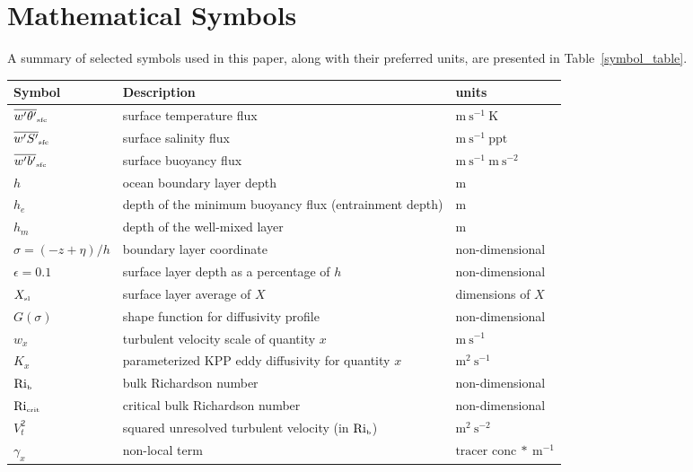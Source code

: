 \documentclass[preprint,12pt,authoryear]{agujournal}
\begin{document}
\section{Mathematical Symbols}
\label{math_symbols}
A summary of selected symbols used in this paper, along with their preferred units, are presented in Table~\ref{symbol_table}.
\begin{table}
	\def\arraystretch{1.15}
	\centering
	\begin{tabular}{ l  p{7cm}  l }
	 \hline
	 Symbol & Description & units \\
	 \hline
	 $\overline{w^\prime \theta^\prime}_{\mbox{\tiny sfc}}$ & surface temperature flux & $\mbox{m}~\mbox{s}^{-1}~\mbox{K}$   \\
	 $\overline{w^\prime S^\prime}_{\mbox{\tiny sfc}}$ & surface salinity flux & $\mbox{m}~\mbox{s}^{-1}~\mbox{ppt}$ \\
	 $\overline{w^\prime b^\prime}_{\mbox{\tiny sfc}}$ & surface buoyancy flux  & $\mbox{m}~\mbox{s}^{-1}~\mbox{m}~\mbox{s}^{-2}$ \\
	 $h$ & ocean boundary layer depth & $\mbox{m}$\\
	 $h_e$ & depth of the minimum buoyancy flux (entrainment depth) & $\mbox{m}$ \\
	 $h_m$ & depth of the well-mixed layer & $\mbox{m}$ \\
   	 $\sigma=(-z+\eta) / h$ & boundary layer coordinate & non-dimensional \\
   	 $\epsilon = 0.1$ & surface layer depth as a percentage of $h$ & non-dimensional \\
   	 $X_{\tiny \mbox{sl}}$ & surface layer average of $X$ & dimensions of $X$ \\
	 $G(\sigma)$ & shape function for diffusivity profile & non-dimensional \\
	 $w_x$ & turbulent velocity scale of quantity $x$ & $\mbox{m}~\mbox{s}^{-1}$ \\
	 $K_x$ & parameterized KPP eddy diffusivity for quantity $x$ & $\mbox{m}^{2}~\mbox{s}^{-1}$ \\
  	 $\mbox{Ri}_{\mbox{\tiny b}}$ & bulk Richardson number & non-dimensional \\
	 $\mbox{Ri}_{\mbox{\tiny crit}}$ & critical bulk Richardson number & non-dimensional \\
  	 $V_t^2$ & squared unresolved turbulent velocity (in $\mbox{Ri}_{\mbox{\tiny b}}$) & $\mbox{m}^{2}~\mbox{s}^{-2}$\\
	 $\gamma_x$ & non-local term & 
     $\mbox{tracer conc}~*~\mbox{m}^{-1}$ \\

\end{tabular}
\end{table}
\end{document}
